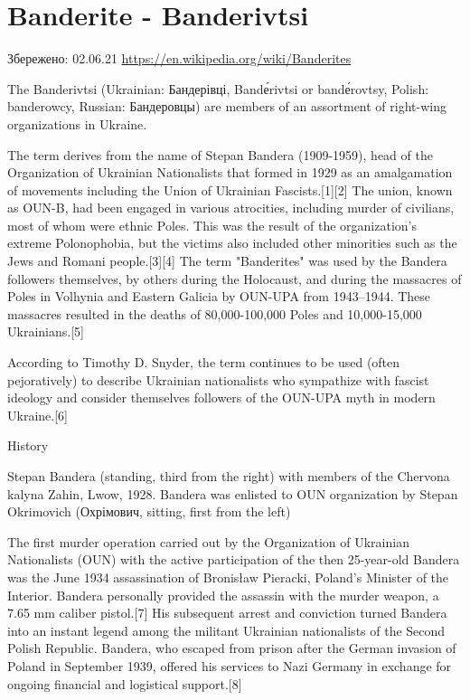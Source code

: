  
 
 
 
 
\section{Banderite - Banderivtsi}

Збережено: 02.06.21
\url{https://en.wikipedia.org/wiki/Banderites}

The Banderivtsi (Ukrainian: Бандерівці, Bandе́rivtsi or bandе́rovtsy, Polish:
banderowcy, Russian: Бандеровцы) are members of an assortment of right-wing
organizations in Ukraine.

The term derives from the name of Stepan Bandera (1909-1959), head of the
Organization of Ukrainian Nationalists that formed in 1929 as an amalgamation
of movements including the Union of Ukrainian Fascists.[1][2] The union, known
as OUN-B, had been engaged in various atrocities, including murder of
civilians, most of whom were ethnic Poles. This was the result of the
organization's extreme Polonophobia, but the victims also included other
minorities such as the Jews and Romani people.[3][4] The term "Banderites" was
used by the Bandera followers themselves, by others during the Holocaust, and
during the massacres of Poles in Volhynia and Eastern Galicia by OUN-UPA from
1943–1944. These massacres resulted in the deaths of 80,000-100,000 Poles and
10,000-15,000 Ukrainians.[5]

According to Timothy D. Snyder, the term continues to be used (often
pejoratively) to describe Ukrainian nationalists who sympathize with fascist
ideology and consider themselves followers of the OUN-UPA myth in modern
Ukraine.[6] 

History

Stepan Bandera (standing, third from the right) with members of the Chervona
kalyna Zahin, Lwow, 1928. Bandera was enlisted to OUN organization by Stepan
Okrimovich (Охрімович, sitting, first from the left)

The first murder operation carried out by the Organization of Ukrainian
Nationalists (OUN) with the active participation of the then 25-year-old
Bandera was the June 1934 assassination of Bronisław Pieracki, Poland's
Minister of the Interior. Bandera personally provided the assassin with the
murder weapon, a 7.65 mm caliber pistol.[7] His subsequent arrest and
conviction turned Bandera into an instant legend among the militant Ukrainian
nationalists of the Second Polish Republic. Bandera, who escaped from prison
after the German invasion of Poland in September 1939, offered his services to
Nazi Germany in exchange for ongoing financial and logistical support.[8]

